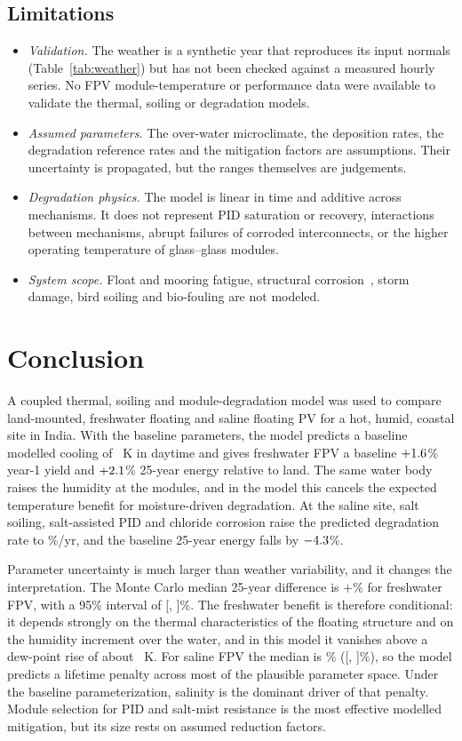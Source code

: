 \documentclass[journal]{IEEEtran}
\begin{document}
\subsection{Limitations}
\begin{itemize}
\item \emph{Validation.} The weather is a synthetic year that reproduces its input normals (Table~\ref{tab:weather})
but has not been checked against a measured hourly series. No FPV module-temperature or performance data were
available to validate the thermal, soiling or degradation models.
\item \emph{Assumed parameters.} The over-water microclimate, the deposition rates, the degradation reference rates and
the mitigation factors are assumptions. Their uncertainty is propagated, but the ranges themselves are judgements.
\item \emph{Degradation physics.} The model is linear in time and additive across mechanisms. It does not represent PID
saturation or recovery, interactions between mechanisms, abrupt failures of corroded interconnects, or the higher
operating temperature of glass--glass modules.
\item \emph{System scope.} Float and mooring fatigue, structural corrosion~\cite{xiong2025,feng2025}, storm damage,
bird soiling and bio-fouling are not modeled.
\end{itemize}
\section{Conclusion}\label{sec:conclusion}
A coupled thermal, soiling and module-degradation model was used to compare land-mounted, freshwater floating and
saline floating PV for a hot, humid, coastal site in India. With the baseline parameters, the model predicts a
baseline modelled cooling of \dTdayF~K in daytime and gives freshwater FPV a baseline $+1.6$\% year-1 yield and
$+2.1$\% 25-year energy relative to land. The same water body raises the humidity at the modules, and in the
model this cancels the expected temperature benefit for moisture-driven degradation. At the saline site, salt soiling,
salt-assisted PID and chloride corrosion raise the predicted degradation rate to \DegTotS\%/yr, and the baseline
25-year energy falls by $-4.3$\%.

Parameter uncertainty is much larger than weather variability, and it changes the interpretation. The Monte Carlo
median 25-year difference is $+$\MCLifeMedF\% for freshwater FPV, with a 95\% interval of [\MCLifeLoF, \MCLifeHiF]\%. The
freshwater benefit is therefore conditional: it depends strongly on the thermal characteristics of the floating structure
and on the humidity increment over the water, and in this model it vanishes above a dew-point rise of about
\DTdStar~K. For saline FPV
the median is \MCLifeMedS\% ([\MCLifeLoS, \MCLifeHiS]\%), so the model predicts a lifetime penalty across most of the
plausible parameter space. Under the baseline parameterization, salinity is the dominant driver of that penalty. Module
selection for PID and salt-mist resistance is the most effective modelled mitigation, but its size rests on assumed
reduction factors.
\end{document}
